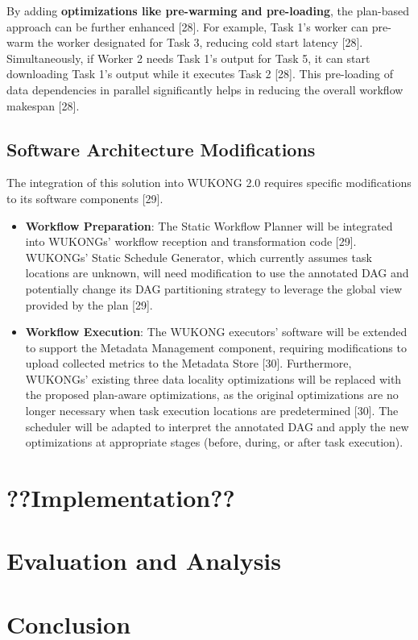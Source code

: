 \documentclass[conference]{IEEEtran}
\begin{document}
By adding \textbf{optimizations like pre-warming and pre-loading}, the plan-based approach can be further enhanced [28]. For example, Task 1's worker can pre-warm the worker designated for Task 3, reducing cold start latency [28]. Simultaneously, if Worker 2 needs Task 1's output for Task 5, it can start downloading Task 1's output while it executes Task 2 [28]. This pre-loading of data dependencies in parallel significantly helps in reducing the overall workflow makespan [28].

\subsection{Software Architecture Modifications}
The integration of this solution into WUKONG 2.0 requires specific modifications to its software components [29].
\begin{itemize}
    \item \textbf{Workflow Preparation}: The Static Workflow Planner will be integrated into WUKONGs' workflow reception and transformation code [29]. WUKONGs' Static Schedule Generator, which currently assumes task locations are unknown, will need modification to use the annotated DAG and potentially change its DAG partitioning strategy to leverage the global view provided by the plan [29].
    \item \textbf{Workflow Execution}: The WUKONG executors' software will be extended to support the Metadata Management component, requiring modifications to upload collected metrics to the Metadata Store [30]. Furthermore, WUKONGs' existing three data locality optimizations will be replaced with the proposed plan-aware optimizations, as the original optimizations are no longer necessary when task execution locations are predetermined [30]. The scheduler will be adapted to interpret the annotated DAG and apply the new optimizations at appropriate stages (before, during, or after task execution).
\end{itemize}

\section{??Implementation??}

\section{Evaluation and Analysis}

\section{Conclusion}



\end{document}
